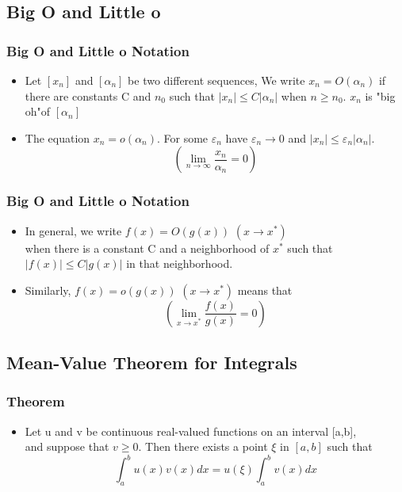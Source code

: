 \documentclass[notheorems,mathserif,table,compress]{beamer}  %
\begin{document}
\subsection{Big O and Little o }
\begin{frame}
  \frametitle{Big O and Little o Notation}
  \begin{itemize}
  \item Let $[x_n]$ and $[\alpha_n]$ be two different  sequences, We write $x_n=O(\alpha_n)$
 if there are constants C and $n_0$ such that $|x_n| \leq C|\alpha_n|$ when $n\geq n_0$. $x_n$ is "big oh"of $[\alpha_n]$   
\newline

  \item  The  equation $x_n=o(\alpha_n)$. For some $\varepsilon_n$ have   $\varepsilon_n \rightarrow 0$ and $|x_n|\leq \varepsilon_n|\alpha_n|$.   
   \begin{displaymath}
  (\lim_{n \to \infty}\frac{x_n}{\alpha_n}=0) 
  \end{displaymath} 
  \end{itemize}
\end{frame}

\begin{frame}
  \frametitle{Big O and Little o Notation}
  \begin{itemize}
  \item In  general, we write $f(x)=O(g(x))$  $(x\rightarrow x^*)$\\
  when  there  is a constant  C and a   neighborhood of $x^*$ such  that  $|f(x)|\leq C|g(x)|$ in that neighborhood.
\newline

 \item  Similarly, $f(x)=o(g(x))$ $(x\rightarrow x^*)$ means that 
\begin{displaymath}
 (\lim_{x \to x^*}\frac {f(x)}{g(x)}=0)
\end{displaymath} 
\end{itemize}
\end{frame}

\subsection{Mean-Value Theorem  for Integrals }
\begin{frame}
  \frametitle{Theorem}
  \begin{itemize}
 \item Let u and v be continuous real-valued functions on an interval [a,b],\\
and suppose  that $v \geq  0$. Then  there  exists a point $\xi$ in $[a,b]$ such that 
\begin{displaymath}
\int _{a}^{b} u(x)v(x)dx {=} u(\xi)\int_{a}^{b}v(x)dx
\end{displaymath} 
  \end{itemize}
\end{frame}
\end{document}
